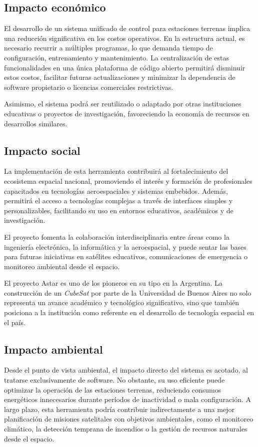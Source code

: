 \subsection*{Impacto económico}

El desarrollo de un sistema unificado de control para estaciones terrenas implica una reducción significativa en los costos operativos. En la estructura actual, es necesario recurrir a múltiples programas, lo que demanda tiempo de configuración, entrenamiento y mantenimiento. La centralización de estas funcionalidades en una única plataforma de código abierto permitirá disminuir estos costos, facilitar futuras actualizaciones y minimizar la dependencia de software propietario o licencias comerciales restrictivas.

Asimismo, el sistema podrá ser reutilizado o adaptado por otras instituciones educativas o proyectos de investigación, favoreciendo la economía de recursos en desarrollos similares.

\subsection*{Impacto social}

La implementación de esta herramienta contribuirá al fortalecimiento del ecosistema espacial nacional, promoviendo el interés y formación de profesionales capacitados en tecnologías aeroespaciales y sistemas embebidos. Además, permitirá el acceso a tecnologías complejas a través de interfaces simples y personalizables, facilitando su uso en entornos educativos, académicos y de investigación.

El proyecto fomenta la colaboración interdisciplinaria entre áreas como la ingeniería electrónica, la informática y la aeroespacial, y puede sentar las bases para futuras iniciativas en satélites educativos, comunicaciones de emergencia o monitoreo ambiental desde el espacio.

El proyecto Astar es uno de los pioneros en su tipo en la Argentina. La construcción de un \textit{CubeSat} por parte de la Universidad de Buenos Aires no solo representa un avance académico y tecnológico significativo, sino que también posiciona a la institución como referente en el desarrollo de tecnología espacial en el país.

\subsection*{Impacto ambiental}

Desde el punto de vista ambiental, el impacto directo del sistema es acotado, al tratarse exclusivamente de software. No obstante, su uso eficiente puede optimizar la operación de las estaciones terrenas, reduciendo consumos energéticos innecesarios durante períodos de inactividad o mala configuración. A largo plazo, esta herramienta podría contribuir indirectamente a una mejor planificación de misiones satelitales con objetivos ambientales, como el monitoreo climático, la detección temprana de incendios o la gestión de recursos naturales desde el espacio.
